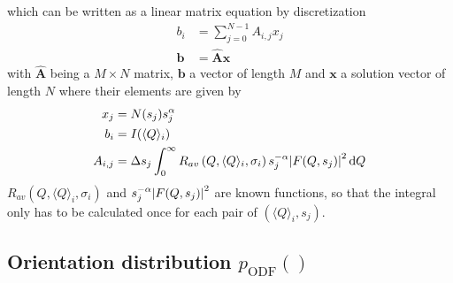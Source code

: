 which can be written as a linear matrix equation by discretization
\begin{align}
\label{eq:discreteFredholm}
b_i &= \sum_{j=0}^{N-1} A_{i,j} x_j \\
\label{eq:discreteFredholmVector}
\mathbf{b} &= \hat{\mathbf{A}}\mathbf{x}
\end{align}
with $\hat{\mathbf{A}}$ being a $M\times N$ matrix, $\mathbf{b}$ a vector of length $M$ and $\mathbf{x}$ a solution vector of length $N$ where their elements are given by
\begin{align}
x_j &= N(s_j) s_j^{\alpha}\\
b_i &= I(\langle Q\rangle_i) \\
A_{i,j} &= \Delta s_j \int_0^\infty R_{av}\left(Q,\langle Q\rangle_i,\sigma_i\right) s_j^{-\alpha} {\left\vert F(Q,s_j)\right\vert}^2 \, \mathrm{d}Q  \label{eq:AijFF}
\end{align}
$R_{av}\left(Q,\langle Q\rangle_i,\sigma_i\right)$ and $s_j^{-\alpha}{\left\vert F(Q,s_j)\right\vert}^2$ are known functions, so that the integral only has to be calculated once for each pair of $(\langle Q\rangle_i,s_j)$.

\subsection{Orientation distribution $p_\mathrm{ODF}()$} ~\\
\label{sec:pODF}

